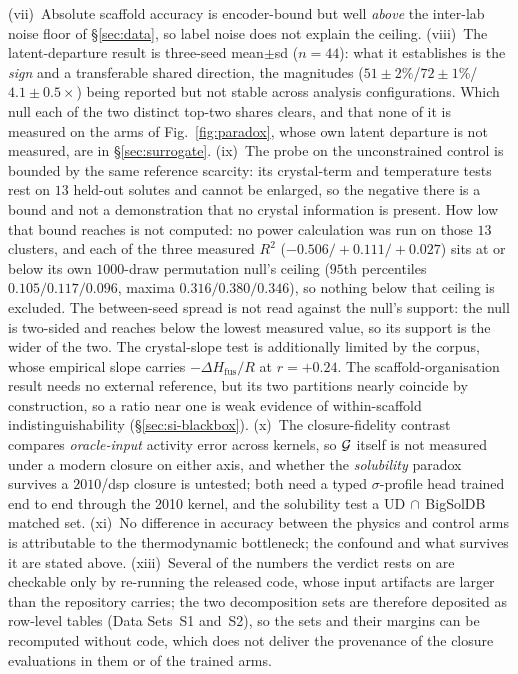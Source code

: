 (vii)~Absolute scaffold
accuracy is encoder-bound but well \emph{above} the inter-lab noise floor of \S\ref{sec:data}, so
label noise does not explain the ceiling.
(viii)~The latent-departure result is three-seed
mean$\pm$sd ($n{=}44$): what it establishes is the \emph{sign} and a transferable shared direction,
the magnitudes ($51\pm2\%$/$72\pm1\%$/$4.1\pm0.5\times$) being reported but not stable across
analysis configurations. Which null each of the two distinct top-two shares clears, and that none of
it is measured on the arms of Fig.~\ref{fig:paradox}, whose own latent departure is not measured,
are in \S\ref{sec:surrogate}.
(ix)~The probe on the unconstrained control is
bounded by the same reference scarcity: its crystal-term and temperature tests rest on $13$ held-out
solutes and cannot be enlarged, so the negative there is a bound and not a
demonstration that no crystal information is present. How low that bound reaches is not computed: no
power calculation was run on those $13$ clusters, and each of the three measured $R^2$
($-0.506/{+}0.111/{+}0.027$) sits at or below its own $1000$-draw permutation null's ceiling ($95$th
percentiles $0.105/0.117/0.096$, maxima $0.316/0.380/0.346$), so nothing below that ceiling is
excluded. The between-seed spread is not read against the null's support: the null is two-sided and
reaches below the lowest measured value, so its support is the wider of the two. The crystal-slope test is additionally limited
by the corpus, whose empirical slope carries $-\Delta H_{\text{fus}}/R$ at $r=+0.24$. The
scaffold-organisation result needs no external reference, but its two partitions nearly coincide by
construction, so a ratio near one is weak evidence of within-scaffold indistinguishability
(\S\ref{sec:si-blackbox}).
(x)~The closure-fidelity contrast compares \emph{oracle-input} activity
error across kernels, so $\mathcal{G}$ itself is not measured under a modern closure on either axis, and
whether the \emph{solubility} paradox survives a $2010$/dsp closure is untested; both need a typed
$\sigma$-profile head trained end to end through the 2010 kernel, and the solubility test a
UD$\,\cap\,$BigSolDB matched set.
(xi)~No difference in accuracy between the physics and control arms
is attributable to the thermodynamic bottleneck; the confound and what survives it are stated above.
(xiii)~Several of the numbers the verdict rests on are checkable only by
re-running the released code, whose input artifacts are larger than the repository carries; the two
decomposition sets are therefore deposited as row-level tables (Data Sets~S1 and~S2), so the sets and
their margins can be recomputed without code, which does not deliver the provenance of the closure
evaluations in them or of the trained arms.


